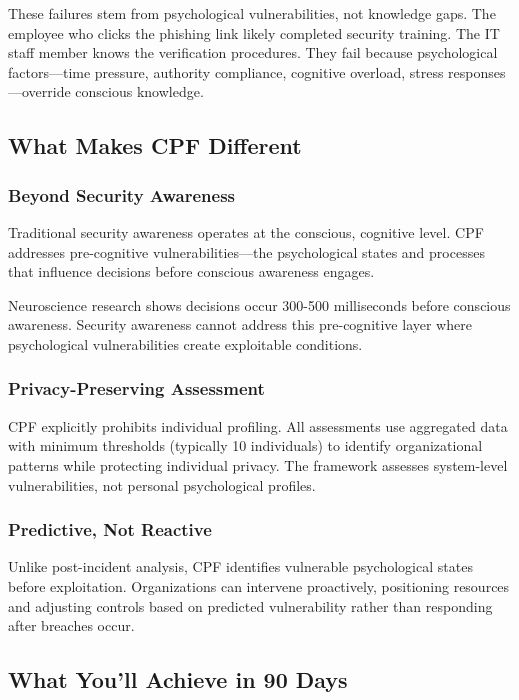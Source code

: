 \documentclass[11pt,a4paper]{article}
\begin{document}
These failures stem from psychological vulnerabilities, not knowledge gaps. The employee who clicks the phishing link likely completed security training. The IT staff member knows the verification procedures. They fail because psychological factors---time pressure, authority compliance, cognitive overload, stress responses---override conscious knowledge.

\subsection{What Makes CPF Different}

\subsubsection{Beyond Security Awareness}

Traditional security awareness operates at the conscious, cognitive level. CPF addresses pre-cognitive vulnerabilities---the psychological states and processes that influence decisions before conscious awareness engages.

Neuroscience research shows decisions occur 300-500 milliseconds before conscious awareness. Security awareness cannot address this pre-cognitive layer where psychological vulnerabilities create exploitable conditions.

\subsubsection{Privacy-Preserving Assessment}

CPF explicitly prohibits individual profiling. All assessments use aggregated data with minimum thresholds (typically 10 individuals) to identify organizational patterns while protecting individual privacy. The framework assesses system-level vulnerabilities, not personal psychological profiles.

\subsubsection{Predictive, Not Reactive}

Unlike post-incident analysis, CPF identifies vulnerable psychological states before exploitation. Organizations can intervene proactively, positioning resources and adjusting controls based on predicted vulnerability rather than responding after breaches occur.

\subsection{What You'll Achieve in 90 Days}
\end{document}
